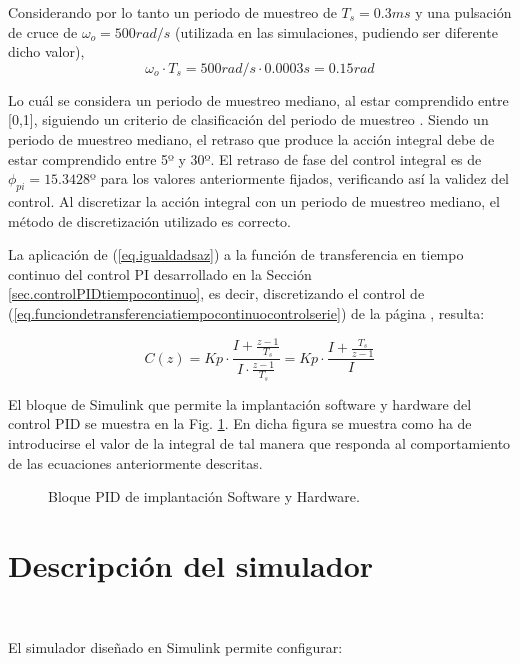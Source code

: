 \documentclass{report}
\begin{document}
Considerando por lo tanto un periodo de muestreo de $T_{s} = 0.3 ms$ y una pulsación de cruce de $\omega_{o} = 500 rad/s$ (utilizada en las simulaciones, pudiendo ser diferente dicho valor),
\begin{equation*}
    \omega_{o}\cdot T_{s} = 500 rad/s \cdot 0.0003 s = 0.15 rad
\end{equation*}

Lo cuál se considera un periodo de muestreo mediano, al estar comprendido entre [0,1], siguiendo un criterio de clasificación del periodo de muestreo . Siendo un periodo de muestreo mediano, el retraso que produce la acción integral debe de estar comprendido entre 5º y 30º. El retraso de fase del control integral es de $\phi_{pi} = 15.3428$º para los valores anteriormente fijados, verificando así la validez del control. Al discretizar la acción integral con un periodo de muestreo mediano, el método de discretización utilizado es correcto.

La aplicación de (\ref{eq.igualdadsaz}) a la función de transferencia en tiempo continuo del control PI desarrollado en la Sección \ref{sec.controlPIDtiempocontinuo}, es decir, discretizando el control de (\ref{eq.funciondetransferenciatiempocontinuocontrolserie}) de la página \pageref{eq.funciondetransferenciatiempocontinuocontrolserie}, resulta:

\begin{equation}
    C(z) = Kp \cdot \frac{I + \frac{z-1}{T_{s} }}{I\cdot\frac{z-1}{T_{s}}} = Kp \cdot \frac{I+\frac{T_{s}}{z-1}}{I}
\end{equation}

El bloque de Simulink que permite la implantación software y hardware del control PID se muestra en la Fig. \ref{fig.bloquepid}. En dicha figura se muestra como ha de introducirse el valor de la integral de tal manera que responda al comportamiento de las ecuaciones anteriormente descritas.

\begin{figure}[!h]
    \centering
    \caption{Bloque PID de implantación Software y Hardware.}
    \label{fig.bloquepid}
\end{figure} 

\section{Descripción del simulador} \label{sec.simulador}

El simulador diseñado en Simulink permite configurar:
\end{document}
